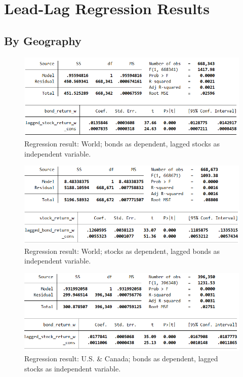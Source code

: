 \chapter{Lead-Lag Regression Results} \label{appendix-regression}

\section{By Geography}

\begin{figure}[H]
	\centering
	\includegraphics[width=1.0\linewidth]{figures/regression-results/regression-world-bonds-as-dependent.PNG}
	\caption{Regression result: World; bonds as dependent, lagged stocks as independent variable. }
	\label{fig:regression-world-bonds-as-dependent}
\end{figure}

\begin{figure}[H]
	\centering
	\includegraphics[width=1.0\linewidth]{figures/regression-results/regression-world-stocks-as-dependent.PNG}
	\caption{Regression result: World; stocks as dependent, lagged bonds as independent variable. }
	\label{fig:regression-world-stocks-as-dependent}
\end{figure}

\begin{figure}[H]
	\centering
	\includegraphics[width=1.0\linewidth]{figures/regression-results/regression-na-bonds-as-dependent.PNG}
	\caption{Regression result: U.S. \& Canada; bonds as dependent, lagged stocks as independent variable. }
	\label{fig:regression-na-bonds-as-dependent}
\end{figure}

